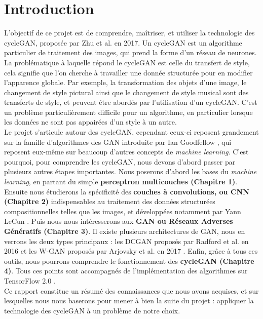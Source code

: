 \chapter*{Introduction}


L'objectif de ce projet est de comprendre, maîtriser, et utiliser la technologie des cycleGAN, proposée par Zhu et al. \cite{zhu_unpaired_2018} en 2017. Un cycleGAN est un algorithme particulier de traitement des images, qui prend la forme d'un réseau de neurones. La problématique à laquelle répond le cycleGAN est celle du transfert de style, cela signifie que l'on cherche à travailler une donnée structurée pour en modifier l’apparence globale. Par exemple, la transformation des objets d'une image, le changement de style pictural ainsi que le changement de style musical sont des transferts de style, et peuvent être abordés par l'utilisation d'un cycleGAN. C'est un problème particulièrement difficile pour un algorithme, en particulier lorsque les données ne sont pas appairées d'un style à un autre.\\

Le projet s'articule autour des cycleGAN, cependant ceux-ci reposent grandement sur la famille d'algorithmes des GAN introduite par Ian Goodfellow \cite{goodfellow_generative_2014-1}, qui reposent eux-même sur beaucoup d'autres concepts de \textit{machine learning}. C'est pourquoi, pour comprendre les cycleGAN, nous devons d'abord passer par plusieurs autres étapes importantes. Nous poserons d'abord les bases du \textit{machine learning}, en partant du simple \textbf{perceptron multicouches (Chapitre 1)}. Ensuite nous étudierons la spécificité des \textbf{couches à convolutions, ou 
CNN (Chapitre 2)} indispensables au traitement des données structurées compositionnelles telles que les images, et développées notamment par Yann LeCun \cite{lecun_gradient-based_1998}. Puis nous nous intéresserons aux \textbf{GAN ou Réseaux Adverses Génératifs (Chapitre 3)}. Il existe plusieurs architectures de GAN, nous en verrons les deux types principaux : les DCGAN proposés par Radford et al. en 2016 \cite{radford_unsupervised_2016} et les W-GAN proposés par Arjovsky et al. en 2017 \cite{arjovsky_wasserstein_2017}. Enfin, grâce à tous ces outils, nous pourrons comprendre le fonctionnement des \textbf{cycleGAN (Chapitre 4)}. Tous ces points sont accompagnés de l'implémentation des algorithmes sur TensorFlow 2.0 \cite{goldsborough_tour_2016}.\\

Ce rapport constitue un résumé des connaissances que nous avons acquises, et sur lesquelles nous nous baserons pour mener à bien la suite du projet : appliquer la technologie des cycleGAN à un problème de notre choix.
